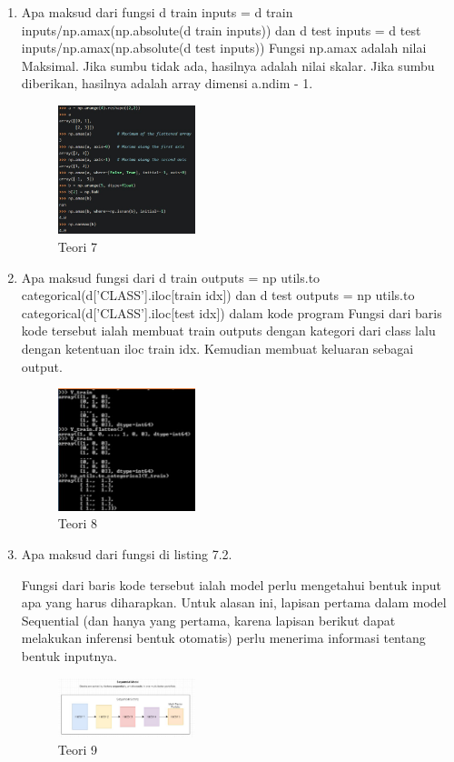 \begin{enumerate}
\item Apa maksud dari fungsi d train inputs = d train inputs/np.amax(np.absolute(d train inputs)) dan d test inputs = d test inputs/np.amax(np.absolute(d test inputs))
\hfill\break
Fungsi np.amax adalah nilai Maksimal. Jika sumbu tidak ada, hasilnya adalah nilai skalar. Jika sumbu diberikan, hasilnya adalah array dimensi a.ndim - 1.
\begin{figure}[H]
\centering
	\includegraphics[width=4cm]{figures/1174075/7/7.jpg}
\caption{Teori 7}
\end{figure}

\item Apa maksud fungsi dari d train outputs = np utils.to categorical(d[’CLASS’].iloc[train idx]) dan d test outputs = np utils.to categorical(d[’CLASS’].iloc[test idx]) dalam kode program
\hfill\break
Fungsi dari baris kode tersebut ialah membuat train outputs dengan kategori dari class lalu dengan ketentuan iloc train idx. Kemudian membuat keluaran sebagai output.
\begin{figure}[H]
\centering
	\includegraphics[width=4cm]{figures/1174075/7/8.jpg}
\caption{Teori 8}
\end{figure}

\item Apa maksud dari fungsi di listing 7.2.
\hfill\break

Fungsi dari baris kode tersebut ialah model perlu mengetahui bentuk input apa yang harus diharapkan. Untuk alasan ini, lapisan pertama dalam model Sequential (dan hanya yang pertama, karena lapisan berikut dapat melakukan inferensi bentuk otomatis) perlu menerima informasi tentang bentuk inputnya.
\begin{figure}[H]
\centering
	\includegraphics[width=4cm]{figures/1174075/7/9.jpg}
\caption{Teori 9}
\end{figure}


\end{enumerate}

